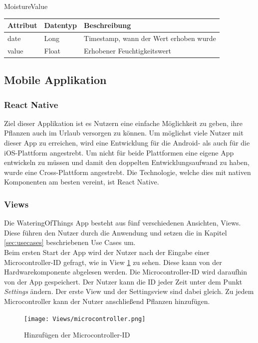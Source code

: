     \begin{minipage}{\textwidth}
        MoistureValue\\
        \begin{tabularx}{\linewidth}{|l|l|X|}
            \hline
            Attribut & Datentyp & Beschreibung\\
            \hline
            date & Long & Timestamp, wann der Wert erhoben wurde \\
            value & Float & Erhobener Feuchtigkeitswert \\
            \hline                              
        \end{tabularx}
    \end{minipage}
    
    \subsection{Mobile Applikation}

        \subsubsection{React Native}
Ziel dieser Applikation ist es Nutzern eine einfache Möglichkeit zu geben, ihre Pflanzen auch im Urlaub versorgen zu können. Um möglichst viele Nutzer mit dieser App zu erreichen, wird eine Entwicklung für die Android- als auch für die iOS-Plattform angestrebt. Um nicht für beide Plattformen eine eigene App entwickeln zu müssen und damit den doppelten Entwicklungsaufwand zu haben, wurde eine Cross-Plattform angestrebt. Die Technologie, welche dies mit nativen Komponenten am besten vereint, ist React Native.
        
        \subsubsection{Views}\label{views}
Die WateringOfThings App besteht aus fünf verschiedenen Ansichten, Views. Diese führen den Nutzer durch die Anwendung und setzen die in Kapitel \ref{sec:usecases} beschriebenen Use Cases um. \\

Beim ersten Start der App wird der Nutzer nach der Eingabe einer Microcontroller-ID gefragt, wie in View \ref{microcontroller} zu sehen. Diese kann von der Hardwarekomponente abgelesen werden. Die Microcontroller-ID wird daraufhin von der App gespeichert. Der Nutzer kann die ID jeder Zeit unter dem Punkt \textit{Settings} ändern. Der erste View und der Settingsview sind dabei gleich. Zu jedem Microcontroller kann der Nutzer anschließend Pflanzen hinzufügen.  
\begin{figure}[H]
    \centering
    \texttt{[image: Views/microcontroller.png]}
    \caption{Hinzufügen der Microcontroller-ID}
    \label{microcontroller}
\end{figure}


